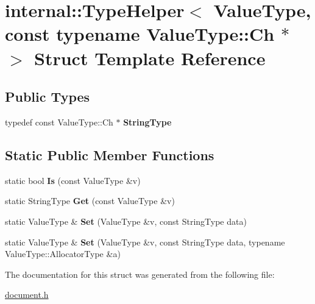 \hypertarget{a02056}{}\section{internal\+:\+:Type\+Helper$<$ Value\+Type, const typename Value\+Type\+:\+:Ch $\ast$ $>$ Struct Template Reference}
\label{a02056}
\subsection*{Public Types}
\begin{DoxyCompactItemize}
\item 
\mbox{\label{a02056_a61b7fd9c92eab60394fdff466251c399}} 
typedef const Value\+Type\+::\+Ch $\ast$ {\bfseries String\+Type}
\end{DoxyCompactItemize}
\subsection*{Static Public Member Functions}
\begin{DoxyCompactItemize}
\item 
\mbox{\label{a02056_a9543f180b6ac2b923486f1b69d5356ea}} 
static bool {\bfseries Is} (const Value\+Type \&v)
\item 
\mbox{\label{a02056_a11f8ddfbc91f1d890d63cc67e3f1abb6}} 
static String\+Type {\bfseries Get} (const Value\+Type \&v)
\item 
\mbox{\label{a02056_af3a44a3b6f485a71a73af69d30668c8f}} 
static Value\+Type \& {\bfseries Set} (Value\+Type \&v, const String\+Type data)
\item 
\mbox{\label{a02056_a8588f2ab1d0ffbb4c1810d60a500a8c5}} 
static Value\+Type \& {\bfseries Set} (Value\+Type \&v, const String\+Type data, typename Value\+Type\+::\+Allocator\+Type \&a)
\end{DoxyCompactItemize}


The documentation for this struct was generated from the following file\+:\begin{DoxyCompactItemize}
\item 
\hyperlink{a00476}{document.\+h}\end{DoxyCompactItemize}
